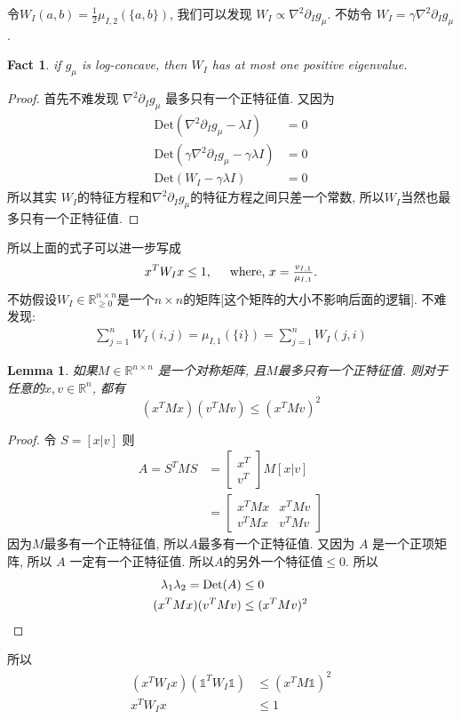 \documentclass{article}
\newtheorem{lemma}{Lemma}
\newtheorem{fact}{Fact}
\begin{document}
令$W_I(a, b) = \frac{1}{2}\mu_{I,2}(\{a,b\})$, 我们可以发现 $W_I \propto \nabla^2\partial_I g_\mu$.
不妨令 $W_I = \gamma \nabla^2\partial_I g_\mu$.
\begin{fact}
  if $g_\mu$ is log-concave, then $W_I$ has at most one positive eigenvalue.
\end{fact}
\begin{proof}[Proof]
  首先不难发现 $\nabla^2\partial_I g_\mu$ 最多只有一个正特征值.
  又因为
  \begin{align*}
    \mathrm{Det}(\nabla^2\partial_I g_\mu - \lambda I) &= 0 \\
    \mathrm{Det}(\gamma\nabla^2\partial_I g_\mu - \gamma\lambda I) &= 0 \\
    \mathrm{Det}(W_I - \gamma\lambda I) &= 0 
  \end{align*}
  所以其实 $W_I$的特征方程和$\nabla^2\partial_Ig_\mu$的特征方程之间只差一个常数, 所以$W_I$当然也最多只有一个正特征值.
\end{proof}
所以上面的式子可以进一步写成
\begin{align*}
  x^T W_I x \leq 1, \hspace{0.5cm} \mbox{where, $x = \frac{v_{I,1}}{\mu_{I,1}}$.}
\end{align*}
不妨假设$W_I\in\mathbb{R}^{n\times n}_{\geq 0}$是一个$n\times n$的矩阵[这个矩阵的大小不影响后面的逻辑].
不难发现:
\begin{align*}
  \sum_{j=1}^n W_I(i, j) = \mu_{I,1}(\{i\}) = \sum_{j=1}^n W_I(j, i)
\end{align*}
\begin{lemma}
  如果$M\in\mathbb{R}^{n\times n}$ 是一个对称矩阵, 且$M$最多只有一个正特征值.
  则对于任意的$x, v\in\mathbb{R}^n$, 都有
  \[(x^TMx)(v^TMv)\leq (x^TMv)^2\]
\end{lemma}
\begin{proof}[Proof]
  令 $S = [x | v]$ 则
  \begin{align*}
    A = S^TMS &= \left[
            \begin{array}{c}
              x^T \\
              \hline
              v^T
            \end{array}
    \right] M \left[x | v \right] \\
    &= \left[
    \begin{array}{cc}
      x^TMx & x^TMv \\
      v^TMx & v^TMv
    \end{array}
    \right]
  \end{align*}
  因为$M$最多有一个正特征值, 所以$A$最多有一个正特征值.
  又因为 $A$ 是一个正项矩阵, 所以 $A$ 一定有一个正特征值.
  所以$A$的另外一个特征值$\leq 0$.
  所以
  \begin{align*}
    \lambda_1\lambda_2 = \mathrm{Det}(A) & \leq 0 \\
    (x^TMx)(v^TMv) &\leq (x^TMv)^2 \qedhere
  \end{align*}
\end{proof}
所以
\begin{align*}
  (x^TW_Ix)(\mathbb{1}^TW_I\mathbb{1}) &\leq (x^TM\mathbb{1})^2 \\
  x^TW_Ix &\leq 1
\end{align*}
\end{document}
